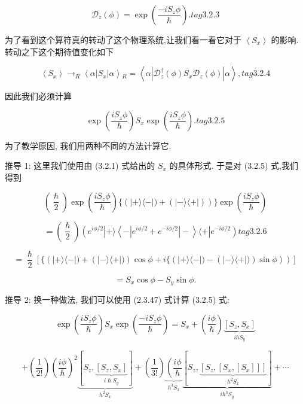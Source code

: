 $$
{\mathcal{D}}_{z}\left( \phi \right) = \exp \left( \frac{-i{S}_{z}\phi }{\hslash }\right) . tag{3.2.3}
$$

为了看到这个算符真的转动了这个物理系统,让我们看一看它对于 $\left\langle {S}_{x}\right\rangle$ 的影响. 转动之下这个期待值变化如下

$$
\left\langle {S}_{x}\right\rangle { \rightarrow }_{R}\left\langle {\alpha \left| {S}_{x}\right| \alpha }\right\rangle {}_{R} = \left\langle {\alpha \left| {{\mathcal{D}}_{z}^{ \dagger }\left( \phi \right) {S}_{x}{\mathcal{D}}_{z}\left( \phi \right) }\right| \alpha }\right\rangle , tag{3.2.4}
$$

因此我们必须计算

$$
\exp \left( \frac{i{S}_{z}\phi }{\hslash }\right) {S}_{x}\exp \left( \frac{i{S}_{z}\phi }{\hslash }\right) . tag{3. 2.5}
$$

为了教学原因, 我们用两种不同的方法计算它.

推导 1: 这里我们使用由 (3.2.1) 式给出的 ${S}_{x}$ 的具体形式. 于是对 (3.2.5) 式,我们得到

$$
\left( \frac{\hslash }{2}\right) \exp \left( \frac{i{S}_{z}\phi }{\hslash }\right) \{ \left( {\left| {+\rangle \langle - }\right| ) + \left( \left| {-\rangle \langle + }\right| \right) }\right) \} \exp \left( \frac{i{S}_{z}\phi }{\hslash }\right)
$$

$$
= \left( \frac{\hslash }{2}\right) \left( {{e}^{{i\phi }/2}\left| {+\rangle \left\langle {-\left| {{e}^{{i\phi }/2} + {e}^{-{i\phi }/2}}\right| - }\right\rangle \langle + }\right| {e}^{-{i\phi }/2}}\right) tag{3.2.6}
$$

$$
= \frac{\hslash }{2}\left\lbrack {\{ \left( {\left| {+\rangle \langle - }\right| ) + \left( {\left| {-\rangle \langle + }\right| )}\right) \cos \phi + i\{ \left( {\left| {+\rangle \langle - }\right| ) - \left( {\left| {-\rangle \langle + }\right| )}\right) \sin \phi }\right) }\right) }\right\rbrack
$$

$$
= {S}_{x}\cos \phi - {S}_{y}\sin \phi .
$$

推导 2: 换一种做法, 我们可以使用 (2.3.47) 式计算 (3.2.5) 式:

$$
\exp \left( \frac{i{S}_{z}\phi }{\hslash }\right) {S}_{x}\exp \left( \frac{-i{S}_{z}\phi }{\hslash }\right) = {S}_{x} + \left( \frac{i\phi }{\hslash }\right) \underset{{ih}{S}_{y}}{\underbrace{\left\lbrack {S}_{z},{S}_{x}\right\rbrack }}
$$

$$
+ \left( \frac{1}{2!}\right) {\left( \frac{i\phi }{\hslash }\right) }^{2}\underset{{h}^{2}{S}_{x}}{\underbrace{\left\lbrack {S}_{z},\underset{i\hslash {S}_{y}}{\underbrace{\left\lbrack {S}_{z},{S}_{x}\right\rbrack }}\right\rbrack }} + \left( \frac{1}{3!}\right) \underset{{h}^{3}{S}_{x}}{\underbrace{\left( \frac{i\phi }{\hslash }\right. }}\underset{i{h}^{3}{S}_{y}}{\underbrace{\left\lbrack {S}_{z},\underset{{h}^{2}{S}_{x}}{\underbrace{\left\lbrack {S}_{z},\left\lbrack {S}_{x},\left\lbrack {S}_{x}\right\rbrack \right\rbrack \right\rbrack }}\right\rbrack }} + \cdots
$$

